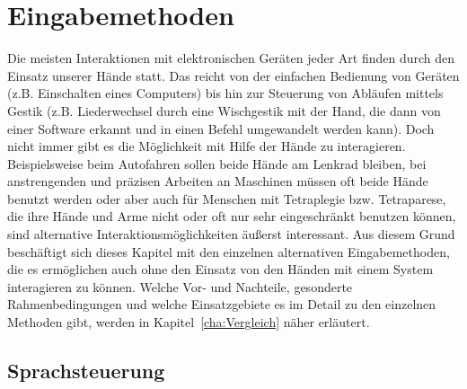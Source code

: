 \chapter{Eingabemethoden}
\label{cha:Eingabe}

Die meisten Interaktionen mit elektronischen Geräten jeder Art finden durch den Einsatz unserer Hände statt. Das reicht von der einfachen Bedienung von Geräten (z.B. Einschalten eines Computers) bis hin zur Steuerung von Abläufen mittels Gestik (z.B. Liederwechsel durch eine Wischgestik mit der Hand, die dann von einer Software erkannt und in einen Befehl umgewandelt werden kann). Doch nicht immer gibt es die Möglichkeit mit Hilfe der Hände zu interagieren. Beispielsweise beim Autofahren sollen beide Hände am Lenkrad bleiben, bei anstrengenden und präzisen Arbeiten an Maschinen müssen oft beide Hände benutzt werden oder aber auch für Menschen mit Tetraplegie bzw. Tetraparese, die ihre Hände und Arme nicht oder oft nur sehr eingeschränkt benutzen können, sind alternative Interaktionsmöglichkeiten äußerst interessant. Aus diesem Grund beschäftigt sich dieses Kapitel mit den einzelnen alternativen Eingabemethoden, die es ermöglichen auch ohne den Einsatz von den Händen mit einem System interagieren zu können. Welche Vor- und Nachteile, gesonderte Rahmenbedingungen und welche Einsatzgebiete es im Detail zu den einzelnen Methoden gibt, werden in Kapitel~\ref{cha:Vergleich} näher erläutert. 

\section{Sprachsteuerung}

